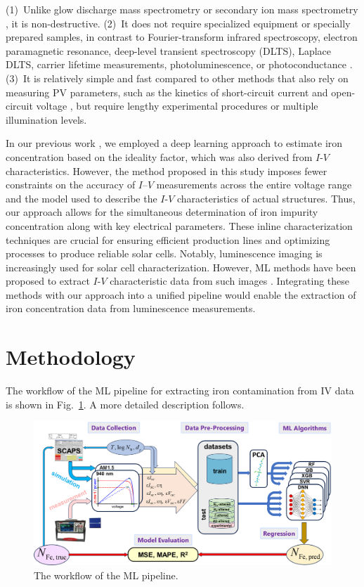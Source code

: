 \documentclass[a4paper,fleqn]{cas-sc}
\begin{document}
\noindent
(1)~Unlike glow discharge mass spectrometry or secondary ion mass spectrometry \cite{DiSabatino2014}, it is non-destructive.
\noindent
(2)~It does not require specialized equipment or specially prepared samples, in contrast
to Fourier-transform infrared spectroscopy, electron paramagnetic resonance, deep-level transient spectroscopy (DLTS),
Laplace DLTS, carrier lifetime measurements, photoluminescence, or photoconductance
\cite{Schroder2006, HowMuchPhysics, LaplDLTS, Rein2, Schmidt2005, FeMethod2012, Goodarzi2017}.
\noindent
(3)~It is relatively simple and fast compared to other methods that also rely on measuring PV parameters,
such as the kinetics of short-circuit current \cite{Olikh2021JAP} and open-circuit voltage \cite{Herguth2022},
but require lengthy experimental procedures or multiple illumination levels.

In our previous work \cite{Olikh2022PPV},
we employed a deep learning approach to estimate iron concentration based on the ideality factor,
which was also derived from $I$-$V$ characteristics.
However, the method proposed in this study imposes fewer constraints on the accuracy of $I$–$V$ measurements across the entire voltage range
and the model used to describe the $I$-$V$ characteristics of actual structures.
Thus, our approach allows for the simultaneous determination of iron impurity concentration along with key electrical parameters.
These inline characterization techniques are crucial for ensuring efficient production lines and optimizing processes to produce reliable solar cells.
Notably, luminescence imaging is increasingly used for solar cell characterization.
However, ML methods have been proposed to extract $I$-$V$ characteristic data from such images \cite{Kunze2023, Battaglia2023}.
Integrating these methods with our approach into a unified pipeline would enable the extraction of iron concentration data from luminescence measurements.

\section{Methodology}
The workflow of the ML pipeline for extracting iron contamination from IV data is shown in Fig.~\ref{fig1}.
 A more detailed description follows.

\begin{figure}
	\centering
		\includegraphics[width=0.9\linewidth]{Fig1.png}
	  \caption{The workflow of the ML pipeline.}\label{fig1}
\end{figure}
\end{document}
